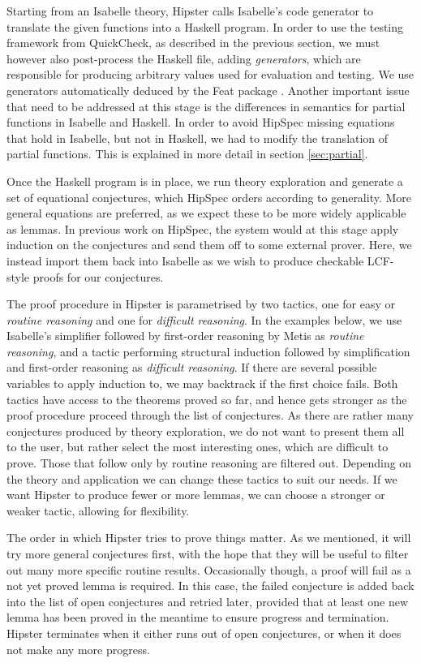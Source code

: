Starting from an Isabelle theory, Hipster calls Isabelle's code generator \cite{codegen} to translate the given functions into a Haskell program. In order to use the testing framework from QuickCheck, as described in the previous section, we must however also post-process the Haskell file, adding \emph{generators}, which are responsible for producing arbitrary values used for evaluation and testing. We use generators automatically deduced by the Feat package \cite{feat}. Another important issue that need to be addressed at this stage is the differences in semantics for partial functions in Isabelle and Haskell. In order to avoid HipSpec missing equations that hold in Isabelle, but not in Haskell, we had to modify the translation of partial functions. This is explained in more detail in section \ref{sec:partial}.

Once the Haskell program is in place, we run theory exploration and generate a set of equational conjectures, which HipSpec orders according to generality. More general equations are preferred, as we expect these to be more widely applicable as lemmas. In previous work on HipSpec, the system would at this stage apply induction on the conjectures and send them off to some external prover. Here, we instead import them back into Isabelle as we wish to produce checkable LCF-style proofs for our conjectures. 

The proof procedure in Hipster is parametrised by two tactics, one for easy or \emph{routine reasoning} and one for \emph{difficult reasoning}. In the examples below, we use Isabelle's simplifier followed by first-order reasoning by Metis as \emph{routine reasoning}, and a tactic performing structural induction followed by simplification and first-order reasoning as \emph{difficult reasoning}. If there are several possible variables to apply induction to, we may backtrack if the first choice fails. Both tactics have access to the theorems proved so far, and hence gets stronger as the proof procedure proceed through the list of conjectures. As there are rather many conjectures produced by theory exploration, we do not want to present them all to the user, but rather select the most interesting ones, which are difficult to prove. Those that follow only by routine reasoning are filtered out. 
Depending on the theory and application we can change these tactics to suit our needs. If we want Hipster to produce fewer or more lemmas, we can choose a stronger or weaker tactic, allowing for flexibility.  

The order in which Hipster tries to prove things matter. As we mentioned, it will try more general conjectures first, with the hope that they will be useful to filter out many more specific routine results. Occasionally though, a proof will fail as a not yet proved lemma is required. In this case, the failed conjecture is added back into the list of open conjectures and retried later, provided that at least one new lemma has been proved in the meantime to ensure progress and termination. Hipster terminates when it either runs out of open conjectures, or when it does not make any more progress. 

